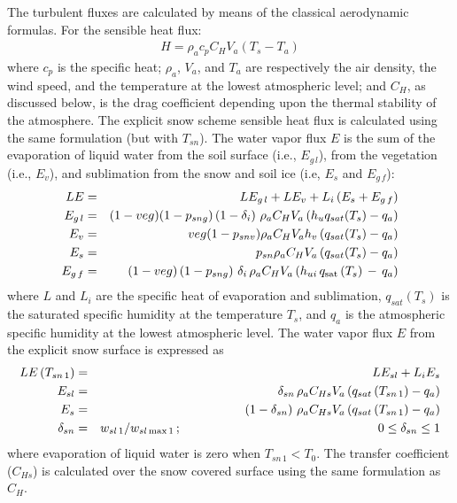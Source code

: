 The turbulent fluxes are calculated by means of the classical
aerodynamic formulas.  For the sensible heat flux:
\begin{eqnarray}
H = \rho_a c_p C_H V_a (T_s - T_a) \label{eqnH}
\end{eqnarray}
where $c_p$ is the specific heat; $\rho_a$, $V_a$, and $T_a$
are respectively the air density, the wind speed, and the
temperature at the lowest atmospheric level; and $C_H$,
as discussed below, is the
drag coefficient depending upon the thermal stability of the
atmosphere. The explicit snow scheme sensible heat flux
is calculated using the same formulation (but with $T_{sn}$).
The water vapor flux $E$ is the sum of the evaporation
of liquid water
from the soil surface (i.e., $E_{g\,l}$), from the vegetation (i.e., $E_v$),
and sublimation from the snow and soil ice (i.e, $E_s$ and $E_{g\,f}$):
%
\begin{eqnarray}
LE &=& LE_{g\,l} + LE_v + L_i \left(E_s + E_{g\,f}\right) \\
E_{g\,l} &=& (1-veg)(1-p_{sng})\left(1-\delta_i\right)\, \rho_a C_H V_a
        \left( h_u q_{sat}(T_s) - q_a \right) \label{eqnLEG} \\
E_v &=& veg (1-p_{snv}) \rho_a C_H V_a h_v
        \left( q_{sat}(T_s) - q_a \right) \\
E_s &=& p_{sn} \rho_a C_H V_a
        \left( q_{sat}(T_s) - q_a \right) \\
E_{g\,f} &=&
\,\left(1-veg\right)\left(1-p_{sng}\right)\,\delta_i\, \rho_a C_H V_a
\left( h_{ui} \,q_{\rm sat}\left(T_s\right) \,-\, q_a \right)
\end{eqnarray}
where $L$ and $L_i$ are the specific heat of evaporation
and sublimation, $q_{sat}(T_s)$ is the saturated
specific humidity at the
temperature $T_s$, and $q_a$ is the atmospheric specific humidity
at the lowest atmospheric level.
The water vapor flux $E$
from the explicit snow surface is expressed as
%
\begin{eqnarray}
LE\left(T_{sn\,1}\right) &=& L E_{sl} + L_i E_s \\
E_{sl} &=& \delta_{sn} \,\rho_a C_{Hs} V_a
        \left( q_{sat}\left(T_{sn\,1}\right) - q_a \right) \\
E_s &=& \left(1-\delta_{sn}\right) \,
        \rho_a C_{Hs} V_a \left( q_{sat}\left(T_{sn\,1}\right) - q_a \right) \\
\delta_{sn} &=& w_{sl\,1}/w_{sl\,{\rm max}\,1}\,;
\hskip2.2in
0 \leq \delta_{sn} \leq 1
\end{eqnarray}
%
where evaporation of liquid water is zero when $T_{sn\,1}<T_0$.
The transfer coefficient ($C_{Hs}$) is calculated over the snow
covered surface using the same formulation as $C_H$.

